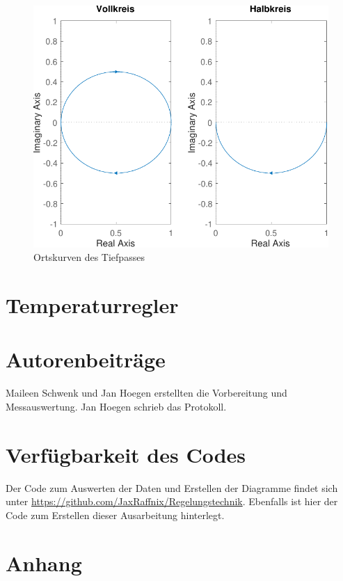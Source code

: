 \documentclass[
    paper=a4,
    fontsize=10pt,
    DIV=calc,
    twocolumn,
    oneside,
]{scrartcl}
\begin{document}
    \begin{figure}
        \centering
        \includegraphics[width=\imagewidth]{../versuch1/ortskurve.pdf}
        \caption{Ortskurven des Tiefpasses}
        \label{fig:ortskurve}
    \end{figure}

\section{Temperaturregler}


\printbibliography[heading=bibnumbered]

\section{Autorenbeiträge}
    Maileen Schwenk und Jan Hoegen erstellten die Vorbereitung und Messauswertung. Jan Hoegen schrieb das Protokoll.

\section{Verfügbarkeit des Codes}
    Der Code zum Auswerten der Daten und Erstellen der Diagramme findet sich unter \url{https://github.com/JaxRaffnix/Regelungstechnik}. Ebenfalls ist hier der Code zum Erstellen dieser Ausarbeitung hinterlegt.


\appendix
\section{Anhang}

    

    
\end{document}
